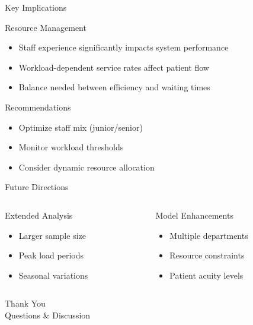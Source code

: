\documentclass[aspectratio=169]{beamer}  %
\begin{document}
\begin{frame}{Key Implications}
    \begin{block}{Resource Management}
        \begin{itemize}
            \item Staff experience significantly impacts system performance
            \item Workload-dependent service rates affect patient flow
            \item Balance needed between efficiency and waiting times
        \end{itemize}
    \end{block}
    \vspace{0.5em}
    \begin{block}{Recommendations}
        \begin{itemize}
            \item Optimize staff mix (junior/senior)
            \item Monitor workload thresholds
            \item Consider dynamic resource allocation
        \end{itemize}
    \end{block}
\end{frame}

\begin{frame}{Future Directions}
    \begin{columns}[T]
        \begin{column}{0.48\textwidth}
            \begin{block}{Extended Analysis}
                \begin{itemize}
                    \item Larger sample size
                    \item Peak load periods
                    \item Seasonal variations
                \end{itemize}
            \end{block}
        \end{column}
        \begin{column}{0.48\textwidth}
            \begin{block}{Model Enhancements}
                \begin{itemize}
                    \item Multiple departments
                    \item Resource constraints
                    \item Patient acuity levels
                \end{itemize}
            \end{block}
        \end{column}
    \end{columns}
\end{frame}

\begin{frame}[standout]
    \begin{center}
        \Huge Thank You\\[1em]
        \large Questions \& Discussion
    \end{center}
\end{frame}
\end{document}
